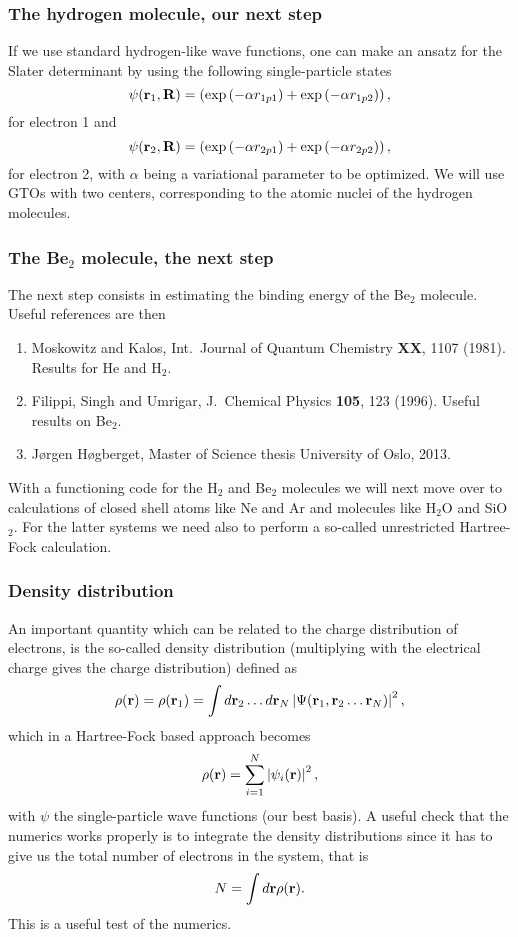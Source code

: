 \frame
{
  \frametitle{The hydrogen molecule, our next step}
\begin{small}
{\scriptsize
If we use standard hydrogen-like wave functions, one can make an ansatz for the 
Slater determinant by using the following single-particle states
\[
   \psi({\bf r}_1,{\bf R})=\left(\exp{(-\alpha r_{1p1})}
      +\exp{(-\alpha r_{1p2})}\right),
\]
for electron 1 and
\[
   \psi({\bf r}_2,{\bf R})=\left(\exp{(-\alpha r_{2p1})}
      +\exp{(-\alpha r_{2p2})}\right),
\]
for electron 2, with
$\alpha$ being a variational parameter to be optimized. 
We will use GTOs with two centers, corresponding to the atomic nuclei of the hydrogen molecules.
}
\end{small}
}
\frame
{
  \frametitle{The Be$_2$ molecule, the next step}
\begin{small}
{\scriptsize
The next step consists in estimating the binding energy of the Be$_2$ molecule.
Useful references are then
\begin{enumerate}
\item Moskowitz and Kalos, Int.~Journal of Quantum Chemistry {\bf XX}, 1107 (1981).
Results for He and H$_2$.
\item Filippi, Singh and Umrigar, J.~Chemical Physics {\bf 105}, 123 (1996).   Useful results on
Be$_2$.
\item J\o rgen H\o gberget, Master of Science thesis University of Oslo, 2013.
\end{enumerate}
With a functioning code for the H$_2$ and Be$_2$ molecules we will next move over to calculations
of closed shell atoms like Ne and Ar and molecules like H$_2$O and SiO$_2$. 
For the latter systems we need also to perform a so-called unrestricted Hartree-Fock calculation.
}
\end{small}
}

\frame
{
  \frametitle{Density distribution}
\begin{small}
{\scriptsize
An important quantity which can be related to the charge distribution of electrons,
is the so-called density distribution  (multiplying with the electrical charge gives the charge distribution) defined as
\[
\rho({\bf r})=\rho({\bf r}_1) = \int d{\bf r}_2\dots d{\bf r}_N \left| \Psi({\bf r}_1,{\bf r}_2\dots {\bf r}_N)\right|^2, 
\]
which in a Hartree-Fock based approach becomes 
\[
\rho({\bf r})=\sum_{i=1}^{N}\left| \psi_i({\bf r})\right|^2,
\]
with $\psi$ the single-particle wave functions (our best basis).  A useful check that the numerics works properly is 
to  integrate the density distributions since it has to give us the total number of electrons in the system, that is
\[
N=\int d{\bf r}\rho({\bf r}).
\]
This is a useful test of the numerics. 
}
\end{small}
}


